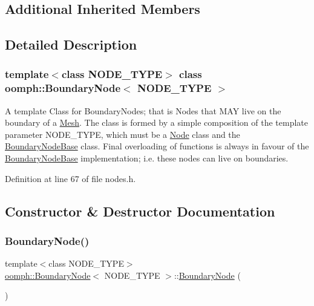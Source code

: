 \subsection*{Additional Inherited Members}


\subsection{Detailed Description}
\subsubsection*{template$<$class N\+O\+D\+E\+\_\+\+T\+Y\+PE$>$\newline
class oomph\+::\+Boundary\+Node$<$ N\+O\+D\+E\+\_\+\+T\+Y\+P\+E $>$}

A template Class for Boundary\+Nodes; that is Nodes that M\+AY live on the boundary of a \hyperlink{classoomph_1_1Mesh}{Mesh}. The class is formed by a simple composition of the template parameter N\+O\+D\+E\+\_\+\+T\+Y\+PE, which must be a \hyperlink{classoomph_1_1Node}{Node} class and the \hyperlink{classoomph_1_1BoundaryNodeBase}{Boundary\+Node\+Base} class. Final overloading of functions is always in favour of the \hyperlink{classoomph_1_1BoundaryNodeBase}{Boundary\+Node\+Base} implementation; i.\+e. these nodes can live on boundaries. 

Definition at line 67 of file nodes.\+h.



\subsection{Constructor \& Destructor Documentation}
\mbox{\label{classoomph_1_1BoundaryNode_aae4348d85debf5606c286e582bf0e475}} 
\subsubsection{\texorpdfstring{Boundary\+Node()}{BoundaryNode()}\hspace{0.1cm}{\footnotesize\ttfamily [1/6]}}
{\footnotesize\ttfamily template$<$class N\+O\+D\+E\+\_\+\+T\+Y\+PE$>$ \\
\hyperlink{classoomph_1_1BoundaryNode}{oomph\+::\+Boundary\+Node}$<$ N\+O\+D\+E\+\_\+\+T\+Y\+PE $>$\+::\hyperlink{classoomph_1_1BoundaryNode}{Boundary\+Node} (\begin{DoxyParamCaption}{ }\end{DoxyParamCaption})\hspace{0.3cm}{\ttfamily [inline]}}



